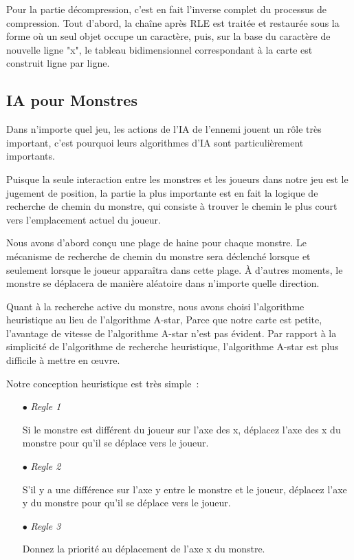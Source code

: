 \documentclass[11pt,english]{article}
\begin{document}
Pour la partie décompression, c’est en fait l’inverse complet du processus de compression. Tout d'abord, la chaîne après RLE est traitée et restaurée sous la forme où un seul objet occupe un caractère, puis, sur la base du caractère de nouvelle ligne "x", le tableau bidimensionnel correspondant à la carte est construit ligne par ligne.


\subsection{IA pour Monstres}

\indent 

Dans n'importe quel jeu, les actions de l'IA de l'ennemi jouent un rôle très important, c'est pourquoi leurs algorithmes d'IA sont particulièrement importants.

\indent Puisque la seule interaction entre les monstres et les joueurs dans notre jeu est le jugement de position, la partie la plus importante est en fait la logique de recherche de chemin du monstre, qui consiste à trouver le chemin le plus court vers l'emplacement actuel du joueur.

\indent Nous avons d'abord conçu une plage de haine pour chaque monstre. Le mécanisme de recherche de chemin du monstre sera déclenché lorsque et seulement lorsque le joueur apparaîtra dans cette plage. À d'autres moments, le monstre se déplacera de manière aléatoire dans n'importe quelle direction.

\indent Quant à la recherche active du monstre, nous avons choisi l'algorithme heuristique au lieu de l'algorithme A-star, Parce que notre carte est petite, l'avantage de vitesse de l'algorithme A-star n'est pas évident. Par rapport à la simplicité de l'algorithme de recherche heuristique, l'algorithme A-star est plus difficile à mettre en œuvre.

\indent Notre conception heuristique est très simple :

\small
{
\begin{itemize}
    \item [$\bullet$] \textit{Regle 1}
    
    Si le monstre est différent du joueur sur l'axe des x, déplacez l'axe des x du monstre pour qu'il se déplace vers le joueur.

    \item [$\bullet$] \textit{Regle 2}
    
    S'il y a une différence sur l'axe y entre le monstre et le joueur, déplacez l'axe y du monstre pour qu'il se déplace vers le joueur.

    \item [$\bullet$] \textit{Regle 3}
    
    Donnez la priorité au déplacement de l’axe x du monstre.

\end{itemize}
}
\end{document}
